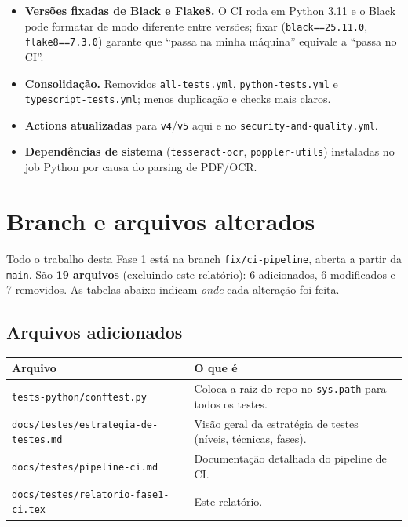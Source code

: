 \documentclass[11pt,a4paper]{article}
\begin{document}
\begin{itemize}[leftmargin=1.4em]
  \item \textbf{Versões fixadas de Black e Flake8.} O CI roda em Python 3.11 e o
        Black pode formatar de modo diferente entre versões; fixar
        (\texttt{black==25.11.0}, \texttt{flake8==7.3.0}) garante que
        ``passa na minha máquina'' equivale a ``passa no CI''.
  \item \textbf{Consolidação.} Removidos \texttt{all-tests.yml},
        \texttt{python-tests.yml} e \texttt{typescript-tests.yml}; menos
        duplicação e checks mais claros.
  \item \textbf{Actions atualizadas} para \texttt{v4}/\texttt{v5} aqui e no
        \texttt{security-and-quality.yml}.
  \item \textbf{Dependências de sistema} (\texttt{tesseract-ocr},
        \texttt{poppler-utils}) instaladas no job Python por causa do
        parsing de PDF/OCR.
\end{itemize}

\section{Branch e arquivos alterados}

Todo o trabalho desta Fase 1 está na branch \texttt{fix/ci-pipeline}, aberta a
partir da \texttt{main}. São \textbf{19 arquivos} (excluindo este relatório):
6 adicionados, 6 modificados e 7 removidos. As tabelas abaixo indicam
\emph{onde} cada alteração foi feita.

\subsection{Arquivos adicionados}

\begin{table}[h]
\centering
\small
\begin{tabular}{@{}p{6.8cm}p{7.5cm}@{}}
\toprule
\textbf{Arquivo} & \textbf{O que é} \\
\midrule
\texttt{tests-python/conftest.py} & Coloca a raiz do repo no \texttt{sys.path} para todos os testes. \\
\texttt{docs/testes/estrategia-de-testes.md} & Visão geral da estratégia de testes (níveis, técnicas, fases). \\
\texttt{docs/testes/pipeline-ci.md} & Documentação detalhada do pipeline de CI. \\
\texttt{docs/testes/relatorio-fase1-ci.tex} & Este relatório. \\
\bottomrule
\end{tabular}
\end{table}
\end{document}
